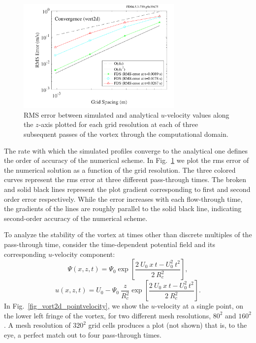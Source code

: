 \documentclass[11pt]{book}
\begin{document}
\begin{figure}[h!]
   \centering
    \includegraphics[height=2.2in]{SCRIPT_FIGURES/vort2d_error}
    \caption[Convergence study for the  test case]{RMS error between simulated and analytical $u$-velocity values along the $z$-axis plotted for each grid resolution at each of three subsequent passes of the vortex through the computational domain.}
    \label{fig_vort2d_error}
\end{figure}

The rate with which the simulated profiles converge to the analytical one defines the order of accuracy of the numerical scheme. In Fig.~\ref{fig_vort2d_error} we plot the rms error of the numerical solution as a function of the grid resolution. The three colored curves represent the rms error at three different pass-through times. The broken and solid black lines represent the plot gradient corresponding to first and second order error respectively. While the error increases with each flow-through time, the gradients of the lines are roughly parallel to the solid black line, indicating second-order accuracy of the numerical scheme.

To analyze the stability of the vortex at times other than discrete multiples of the pass-through time, consider the time-dependent potential field and its corresponding $u$-velocity component:
\begin{equation}
\label{eqn_vort2d_timedep}
\Psi (x,z,t) = \Psi_{0} \exp \left[\frac{2 \ U_{0} \ x \ t - U_{0}^{2} \ t^{2}}{2 \ R_{c}^{2}} \right],
\end{equation}
\begin{equation}
\label{eqn_uvel_timedep}
u (x,z,t) = U_{0} - \Psi_{0} \ \frac{z}{R_{c}^{2}} \exp \left[\frac{2 \ U_{0} \ x \ t - U_{0}^{2} \ t^{2}}{2 \ R_{c}^{2}} \right].
\end{equation}
In Fig.~\ref{fig_vort2d_pointvelocity}, we show the $u$-velocity at a single point, on the lower left fringe of the vortex, for two different mesh resolutions, $80^{2}$ and $160^{2}$. A mesh resolution of $320^{2}$ grid cells produces a plot (not shown) that is, to the eye, a perfect match out to four pass-through times.
\end{document}
